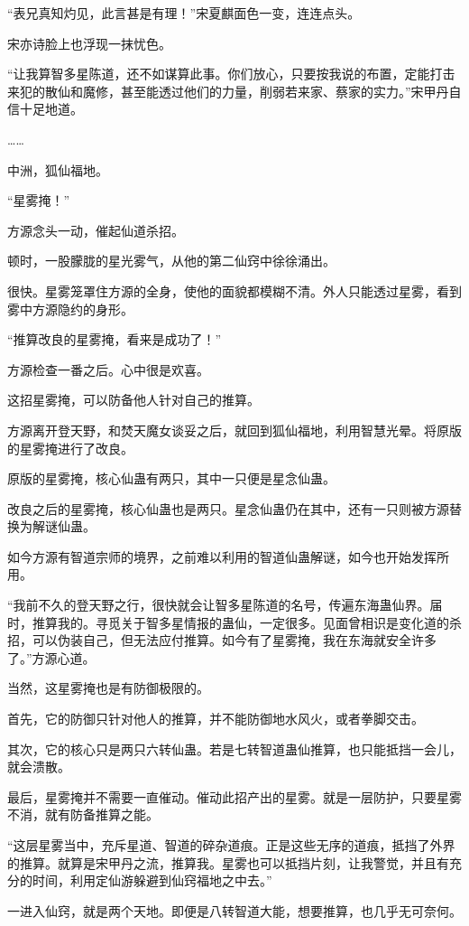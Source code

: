 \begin{this_body}
“表兄真知灼见，此言甚是有理！”宋夏麒面色一变，连连点头。

宋亦诗脸上也浮现一抹忧色。

“让我算智多星陈道，还不如谋算此事。你们放心，只要按我说的布置，定能打击来犯的散仙和魔修，甚至能透过他们的力量，削弱若来家、蔡家的实力。”宋甲丹自信十足地道。

……

中洲，狐仙福地。

“星雾掩！”

方源念头一动，催起仙道杀招。

顿时，一股朦胧的星光雾气，从他的第二仙窍中徐徐涌出。

很快。星雾笼罩住方源的全身，使他的面貌都模糊不清。外人只能透过星雾，看到雾中方源隐约的身形。

“推算改良的星雾掩，看来是成功了！”

方源检查一番之后。心中很是欢喜。

这招星雾掩，可以防备他人针对自己的推算。

方源离开登天野，和焚天魔女谈妥之后，就回到狐仙福地，利用智慧光晕。将原版的星雾掩进行了改良。

原版的星雾掩，核心仙蛊有两只，其中一只便是星念仙蛊。

改良之后的星雾掩，核心仙蛊也是两只。星念仙蛊仍在其中，还有一只则被方源替换为解谜仙蛊。

如今方源有智道宗师的境界，之前难以利用的智道仙蛊解谜，如今也开始发挥所用。

“我前不久的登天野之行，很快就会让智多星陈道的名号，传遍东海蛊仙界。届时，推算我的。寻觅关于智多星情报的蛊仙，一定很多。见面曾相识是变化道的杀招，可以伪装自己，但无法应付推算。如今有了星雾掩，我在东海就安全许多了。”方源心道。

当然，这星雾掩也是有防御极限的。

首先，它的防御只针对他人的推算，并不能防御地水风火，或者拳脚交击。

其次，它的核心只是两只六转仙蛊。若是七转智道蛊仙推算，也只能抵挡一会儿，就会溃散。

最后，星雾掩并不需要一直催动。催动此招产出的星雾。就是一层防护，只要星雾不消，就有防备推算之能。

“这层星雾当中，充斥星道、智道的碎杂道痕。正是这些无序的道痕，抵挡了外界的推算。就算是宋甲丹之流，推算我。星雾也可以抵挡片刻，让我警觉，并且有充分的时间，利用定仙游躲避到仙窍福地之中去。”

一进入仙窍，就是两个天地。即便是八转智道大能，想要推算，也几乎无可奈何。


\end{this_body}
